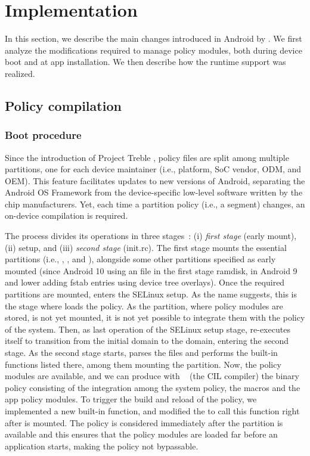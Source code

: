 \section{Implementation}\label{sect:seapp_implementation}

In this section, we describe the main changes introduced in Android by
\seapp.  We first analyze the modifications required to manage policy
modules, both during device boot and at app installation.  We then
describe how the runtime support was realized.

\subsection{Policy compilation}\label{sect:seapp_syst_impl}

\subsubsection{Boot procedure}

Since the introduction of Project Treble \cite{seapp_treble}, policy
files are split among multiple partitions, one for each device
maintainer (i.e., platform, SoC vendor, ODM, and OEM).  This feature
facilitates updates to new versions of Android, separating the Android
OS Framework from the device-specific low-level software written by
the chip manufacturers.  Yet, each time a partition policy (i.e., a
segment) changes, an on-device compilation is required.

The \init process divides its operations in three
stages~\cite{seapp_initstages}: (i) {\em first stage} (early mount),
(ii) \sel setup, and (iii) {\em second stage} (init.rc).  The first
stage mounts the essential partitions (i.e., \dev, \proc, \sys and
\selinuxfsfull), alongside some other partitions specified as early
mounted (since Android 10 using an \fstab file in the first stage
ramdisk, in Android 9 and lower adding fstab entries using device tree
overlays).  Once the required partitions are mounted, \init enters the
SELinux setup.  As the name suggests, this is the stage where \init
loads the \sel policy.  As the \data partition, where policy modules
are stored, is not yet mounted, it is not yet possible to integrate
them with the policy of the system.  Then, as last operation of the
SELinux setup stage, \init re-executes itself to transition from the
initial  domain to the \initdomain domain, entering the second
stage.  As the second stage starts, \init parses the \initrc files and
performs the built-in functions listed there, among them mounting the
\data partition.  Now, the policy modules are available, and we can
produce with \secilc~\cite{seapp_secilccom} (the \sel CIL compiler)
the binary policy consisting of the integration among the system
policy, the \seapp macros and the app policy modules.  To trigger the
build and reload of the policy, we implemented a new built-in function,
and modified the \initrc to call this function right after \data is
mounted.  The policy is considered immediately after the \data
partition is available and this ensures that the policy modules are
loaded far before an application starts, making the policy not
bypassable.

